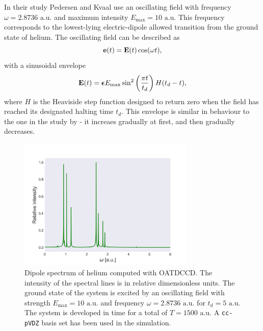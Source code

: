 In their study Pedersen and Kvaal \cite{pedersen2019symplectic} use an oscillating field with 
frequency $\omega=2.8736 \text{ a.u.}$ and maximum intensity
$E_\text{max} = 10 \text{ a.u.}$ This frequency corresponds to the lowest-lying 
electric-dipole allowed transition from the ground state of helium. The oscillating 
field can be described as 
\begin{equation}
    \vb{e}(t) = \vb{E}(t) \cos(\omega t),
\end{equation}
with a sinusoidal envelope
\begin{equation}
    \label{eq:pedersen_2019_envelope}
    \vb{E}(t) = \boldsymbol{\epsilon} E_\text{max}\sin^2\left(\frac{\pi t}{t_d}\right) H(t_d - t),
\end{equation}
where $H$ is the Heaviside step function designed to return zero when the field 
has reached its designated halting time $t_d$. This envelope is similar in behaviour 
to the one in the study by \citeauthor{li2005time} \cite{li2005time} - it 
increaes gradually at first, and then gradually decreases. 

\begin{figure}
    \centering
    \includegraphics[width=0.75\textwidth]{results/figures/helium_spectrum.png} 
    \caption{Dipole spectrum of helium computed with OATDCCD. The intensity of the 
        spectral lines is in relative dimensionless units.
        The ground state of the system is excited by 
        an oscillating field with strength $E_\text{max} = 10\text{ a.u.}$ and 
        frequency $\omega = 2.8736 \text{ a.u.}$ for $t_d = 5 \text{ a.u.}$ The
        system is developed in time for a total of $T = 1500 \text{ a.u.}$
        A \lstinline{cc-pVDZ} basis set has been used in the simulation. 
    }
    \label{fig:helium_spectrum}
\end{figure}

